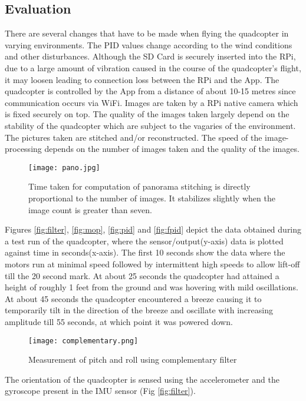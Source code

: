 \subsection{Evaluation}
There are several changes that have to be made when flying the quadcopter in varying environments. The PID values change according to the wind conditions and other disturbances. Although the SD Card is securely inserted into the RPi, due to a large amount of vibration caused in the course of the quadcopter's flight, it may loosen leading to connection loss between the RPi and the App. 
\newline \newline
The quadcopter is controlled by the App from a distance of about 10-15 metres since communication occurs via WiFi. Images are taken by a RPi native camera which is fixed securely on top. The quality of the images taken largely depend on the stability of the quadcopter which are subject to the vagaries of the environment.
The pictures taken are stitched and/or reconstructed. The speed of the image-processing depends on the number of images taken and the quality of the images. 
\begin{figure}[H]
  \centering
  \texttt{[image: pano.jpg]}
  \caption{Time taken for computation of panorama stitching is directly proportional to the number of images. It stabilizes slightly when the image count is greater than seven.}
  \label{panorama stitching time graph} 
\end{figure}
\noindent
Figures \ref{fig:filter}, \ref{fig:mop}, \ref{fig:pid} and \ref{fig:fpid} depict the data obtained during a test run of the quadcopter, where the sensor/output(y-axis) data is plotted against time in seconds(x-axis).
The first 10 seconds show the data where the motors run at minimal speed followed by intermittent high speeds to allow lift-off till the 20 second mark. At about 25 seconds the quadcopter had attained a height of roughly 1 feet from the ground and was hovering with mild oscillations. At about 45 seconds the quadcopter encountered a breeze causing it to temporarily tilt in the direction of the breeze and oscillate with increasing amplitude till 55 seconds, at which point it was powered down.
\begin{figure}[H]
  \centering
  \texttt{[image: complementary.png]}
  \caption{Measurement of pitch and roll using complementary filter \label{fig:filter}}
  \label{Measurement of pitch and roll} 
\end{figure}
\noindent
The orientation of the quadcopter is sensed using the accelerometer and the gyroscope present in the IMU sensor (Fig \ref{fig:filter}).
